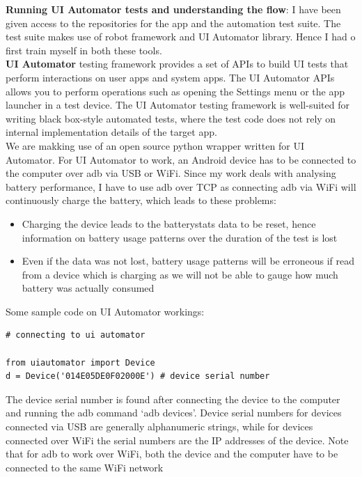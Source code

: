\documentclass[a4paper,12pt]{article}
\begin{document}
\textbf{Running UI Automator tests and understanding the flow}: I have been given access to the repositories for the app and the automation test suite. The test suite makes use of robot framework and UI Automator library. Hence I had o first train myself in both these tools. \\

\textbf{UI Automator} testing framework provides a set of APIs to build UI tests that perform interactions on user apps and system apps. The UI Automator APIs allows you to perform operations such as opening the Settings menu or the app launcher in a test device. The UI Automator testing framework is well-suited for writing black box-style automated tests, where the test code does not rely on internal implementation details of the target app.\cite{uiautomator} \\

We are makking use of an open source python wrapper written for UI Automator. For UI Automator to work, an Android device has to be connected to the computer over adb via USB or WiFi. Since my work deals with analysing battery performance, I have to use adb over TCP as connecting adb via WiFi will continuously charge the battery, which leads to these problems:
\begin{itemize}
	\item Charging the device leads to the batterystats data to be reset, hence information on battery usage patterns over the duration of the test is lost
	\item Even if the data was not lost, battery usage patterns will be erroneous if read from a device which is charging as we will not be able to gauge how much battery was actually consumed
\end{itemize}	 

Some sample code on UI Automator workings:

\begin{lstlisting}[style=PyStyle]
# connecting to ui automator

from uiautomator import Device
d = Device('014E05DE0F02000E') # device serial number 
\end{lstlisting}

The device serial number is found after connecting the device to the computer and running the adb command `adb devices'. Device serial numbers for devices connected via USB are generally alphanumeric strings, while for devices connected over WiFi the serial numbers are the IP addresses of the device. Note that for adb to work over WiFi, both the device and the computer have to be connected to the same WiFi network
\end{document}
